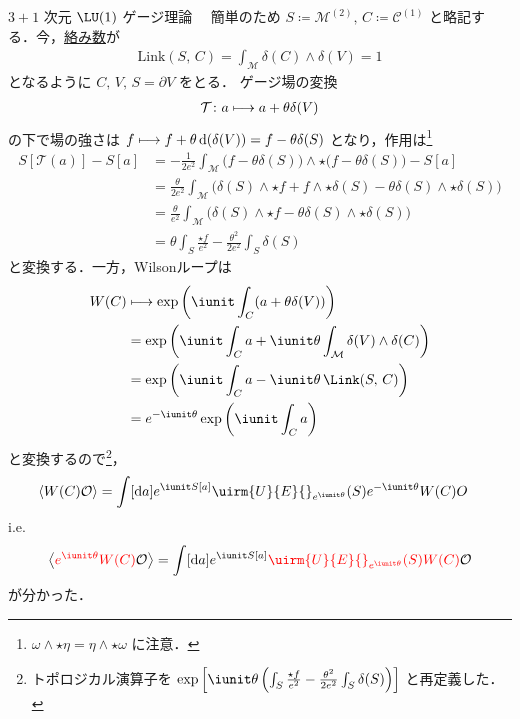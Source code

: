 \documentclass[TQFT_main]{subfiles}
\begin{document}
\begin{myexample}[label=ex:3-2]{$3+1$ 次元 $\LU(1)$ ゲージ理論}
    　簡単のため $S \coloneqq \mathcal{M}^{(2)},\, C \coloneqq \mathcal{C}^{(1)}$ と略記する．今，\hyperref[eq:def-Link]{絡み数}が
    \begin{align}
        \mathrm{Link}(S,\, C) = \int_{\mathcal{M}} \delta(C) \wedge \delta(V) = 1
    \end{align}
    となるように $C,\, V,\, S = \partial V$ をとる．
    ゲージ場の変換
    \begin{align}
        \mathcal{T} \colon a \longmapsto a + \theta \delta(V)
    \end{align}
    の下で場の強さは $f \longmapsto f + \theta \dd(\delta(V)) = f - \theta \delta(S)$ となり，作用は\footnote{$\omega \wedge \star \eta = \eta \wedge \star \omega$ に注意．}
    \begin{align}
        S[\mathcal{T}(a)] - S[a]
        &= -\frac{1}{2e^2} \int_{\mathcal{M}} \bigl(f - \theta \delta(S) \bigr) \wedge \star\bigl(f - \theta \delta(S) \bigr) - S[a] \\
        &= \frac{\theta}{2e^2} \int_{\mathcal{M}} \bigl( \delta(S) \wedge \star f + f \wedge \star \delta(S) - \theta \delta(S) \wedge \star \delta(S) \bigr) \\
        &= \frac{\theta}{e^2} \int_{\mathcal{M}} \bigl( \delta(S) \wedge \star f - \theta \delta(S) \wedge \star \delta(S) \bigr) \\
        &= \theta \int_{S} \frac{\star f}{e^2} - \frac{\theta^2}{2e^2} \int_S \delta(S)
    \end{align}
    と変換する．一方，Wilsonループは
    \begin{align}
        W(C) 
        & \lmto \exp \left( \iunit \int_C (a + \theta \delta(V)) \right)  \\
        &= \exp \left( \iunit \int_C a + \iunit \theta \int_{\mathcal{M}}\delta(V) \wedge \delta(C) \right) \\
        &= \exp \left( \iunit \int_C a - \iunit \theta\, \Link(S,\, C) \right) \\
        &= e^{-\iunit \theta} \exp \left( \iunit \int_C a \right)
    \end{align}
    と変換するので\footnote{トポロジカル演算子を $\exp \left[\iunit \theta \left(\int_{S} \frac{\star f}{e^2} - \frac{\theta^2}{2e^2} \int_S \delta(S)\right)\right]$ と再定義した．}，
    \begin{align}
        \ev{W(C) \mathcal{O}}
        &= \int [\dd{a}] e^{\iunit S[a]} \uirm{U}{E}{}_{e^{\iunit \theta}} (S) e^{-\iunit \theta} W(C) O
    \end{align}
    i.e.
    \begin{align}
        \ev{\textcolor{red}{e^{\iunit \theta} W(C)} \mathcal{O}} = \int [\dd{a}] e^{\iunit S[a]} \textcolor{red}{\uirm{U}{E}{}_{e^{\iunit \theta}} (S) W(C)} \mathcal{O}
    \end{align}
    が分かった．


\end{myexample}
\end{document}
